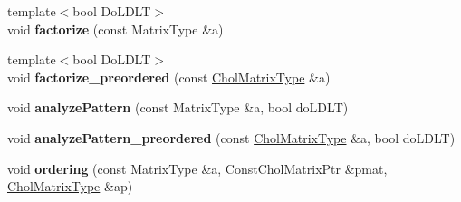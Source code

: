 \begin{DoxyCompactItemize}
\mbox{\label{group___sparse_cholesky___module_ad62e844358aa1f5b69690e069f9354c9}} 
{\footnotesize template$<$bool Do\+L\+D\+LT$>$ }\\void {\bfseries factorize} (const Matrix\+Type \&a)
\item 
\mbox{\label{group___sparse_cholesky___module_a340f5bfbe509aad506ebda8d9877d918}} 
{\footnotesize template$<$bool Do\+L\+D\+LT$>$ }\\void {\bfseries factorize\+\_\+preordered} (const \hyperlink{group___sparse_core___module}{Chol\+Matrix\+Type} \&a)
\item 
\mbox{\label{group___sparse_cholesky___module_aaf20ed812a661069f9e484649ae9be1e}} 
void {\bfseries analyze\+Pattern} (const Matrix\+Type \&a, bool do\+L\+D\+LT)
\item 
\mbox{\label{group___sparse_cholesky___module_ac2acafc9b7cdc089f89b6777e7469b73}} 
void {\bfseries analyze\+Pattern\+\_\+preordered} (const \hyperlink{group___sparse_core___module}{Chol\+Matrix\+Type} \&a, bool do\+L\+D\+LT)
\item 
\mbox{\label{group___sparse_cholesky___module_a4e59a8081d09fd8ff1ce9db4becbc150}} 
void {\bfseries ordering} (const Matrix\+Type \&a, Const\+Chol\+Matrix\+Ptr \&pmat, \hyperlink{group___sparse_core___module}{Chol\+Matrix\+Type} \&ap)
\end{DoxyCompactItemize}
